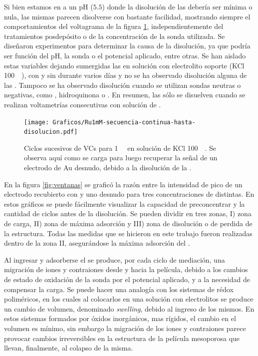		Si bien estamos en a un pH ($5.5$) donde la disolución de las \pdmF\space debería ser mínima o nula, las mismas parecen disolverse con bastante facilidad, mostrando siempre el comportamientos del voltagrama de la figura \ref{fig:diso_ru1mM}, independientemente del tratamientos posdepósito o de la concentración de la sonda utilizada. Se diseñaron experimentos para determinar la causa de la disolución, ya que podría ser función del pH, la sonda o el potencial aplicado, entre otras. Se han aislado estas variables dejando sumergidas las \pdmF\space en solución con electrolito soporte (KCl \SI{100}{\milli\Molar}), con y sin \ru\space durante varios días y no se ha observado disolución alguna de las \pdm. Tampoco se ha observado disolución cuando se utilizan sondas neutras o negativas, como \fe, hidroquinona o \fc. En resumen, las \pdmF\space sólo se disuelven cuando se realizan voltametrías consecutivas con solución de \ru\space.
			
		 	\begin{figure}[t!]
				\centering
		 	    \texttt{[image: Graficos/Ru1mM-secuencia-continua-hasta-disolucion.pdf]}
		        \caption[Disolución de una \pdmF\space en \ru.]{Ciclos sucesivos de VCs para \ru\space \SI{1}{\milli\Molar} en solución de KCl \SI{100}{\milli\Molar}. Se observa aquí como se carga para luego recuperar la señal de un electrodo de Au desnudo, debido a la disolución de la \pdmF.}
		        \label{fig:diso_ru1mM}
		      	\end{figure} 

	    En la figura \ref{fig:ventanas} se graficó la razón entre la intensidad de pico de un electrodo recubierto con \pdmF\space y uno desnudo para tres concentraciones de \ru\space distintas. En estos gráficos se puede fácilmente visualizar la capacidad de preconcentrar y la cantidad de ciclos antes de la disolución. Se pueden dividir en tres zonas, I) zona de carga, II) zona de máxima adsorción y III) zona de disolución o de perdida de la estructura. Todas las medidas que se hicieron en este trabajo fueron realizadas dentro de la zona II, asegurándose la máxima adsorción del \ru\space.


		Al ingresar y adsorberse el \ru\space se produce, por cada ciclo de mediación, una migración de iones y contraiones desde y hacia la película, debido a los cambios de estado de oxidación de la sonda por el potencial aplicado, y a la necesidad de compensar la carga.  Se puede hacer una analogía con los sistemas de rédox poliméricos, en los cuales al colocarlos en una solución con electrolitos se produce un cambio de volumen, denominado \textit{swelling}, debido al ingreso de los mismos\cite{ybarra2005}. En estos sistemas formados por óxidos inorgánicos, mas rígidos, el cambio en el volumen es mínimo,\cite{Malfatti2009} sin embargo la migración de los iones y contraiones parece provocar cambios irreversibles en la estructura de la película mesoporosa que llevan, finalmente, al colapso de la misma.

